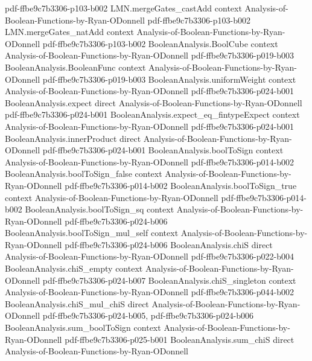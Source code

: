 \begin{lemma}
  {pdf-ffbe9c7b3306-p103-b002}
\proofstep
  {LMN.mergeGates_castAdd}
  {context}
  {Analysis-of-Boolean-Functions-by-Ryan-ODonnell}
  {pdf-ffbe9c7b3306-p103-b002}
\proofstep
  {LMN.mergeGates_natAdd}
  {context}
  {Analysis-of-Boolean-Functions-by-Ryan-ODonnell}
  {pdf-ffbe9c7b3306-p103-b002}
\proofstep
  {BooleanAnalysis.BoolCube}
  {context}
  {Analysis-of-Boolean-Functions-by-Ryan-ODonnell}
  {pdf-ffbe9c7b3306-p019-b003}
\proofstep
  {BooleanAnalysis.BooleanFunc}
  {context}
  {Analysis-of-Boolean-Functions-by-Ryan-ODonnell}
  {pdf-ffbe9c7b3306-p019-b003}
\proofstep
  {BooleanAnalysis.uniformWeight}
  {context}
  {Analysis-of-Boolean-Functions-by-Ryan-ODonnell}
  {pdf-ffbe9c7b3306-p024-b001}
\proofstep
  {BooleanAnalysis.expect}
  {direct}
  {Analysis-of-Boolean-Functions-by-Ryan-ODonnell}
  {pdf-ffbe9c7b3306-p024-b001}
\proofstep
  {BooleanAnalysis.expect_eq_fintypeExpect}
  {context}
  {Analysis-of-Boolean-Functions-by-Ryan-ODonnell}
  {pdf-ffbe9c7b3306-p024-b001}
\proofstep
  {BooleanAnalysis.innerProduct}
  {direct}
  {Analysis-of-Boolean-Functions-by-Ryan-ODonnell}
  {pdf-ffbe9c7b3306-p024-b001}
\proofstep
  {BooleanAnalysis.boolToSign}
  {context}
  {Analysis-of-Boolean-Functions-by-Ryan-ODonnell}
  {pdf-ffbe9c7b3306-p014-b002}
\proofstep
  {BooleanAnalysis.boolToSign_false}
  {context}
  {Analysis-of-Boolean-Functions-by-Ryan-ODonnell}
  {pdf-ffbe9c7b3306-p014-b002}
\proofstep
  {BooleanAnalysis.boolToSign_true}
  {context}
  {Analysis-of-Boolean-Functions-by-Ryan-ODonnell}
  {pdf-ffbe9c7b3306-p014-b002}
\proofstep
  {BooleanAnalysis.boolToSign_sq}
  {context}
  {Analysis-of-Boolean-Functions-by-Ryan-ODonnell}
  {pdf-ffbe9c7b3306-p024-b006}
\proofstep
  {BooleanAnalysis.boolToSign_mul_self}
  {context}
  {Analysis-of-Boolean-Functions-by-Ryan-ODonnell}
  {pdf-ffbe9c7b3306-p024-b006}
\proofstep
  {BooleanAnalysis.chiS}
  {direct}
  {Analysis-of-Boolean-Functions-by-Ryan-ODonnell}
  {pdf-ffbe9c7b3306-p022-b004}
\proofstep
  {BooleanAnalysis.chiS_empty}
  {context}
  {Analysis-of-Boolean-Functions-by-Ryan-ODonnell}
  {pdf-ffbe9c7b3306-p024-b007}
\proofstep
  {BooleanAnalysis.chiS_singleton}
  {context}
  {Analysis-of-Boolean-Functions-by-Ryan-ODonnell}
  {pdf-ffbe9c7b3306-p044-b002}
\proofstep
  {BooleanAnalysis.chiS_mul_chiS}
  {direct}
  {Analysis-of-Boolean-Functions-by-Ryan-ODonnell}
  {pdf-ffbe9c7b3306-p024-b005,
    pdf-ffbe9c7b3306-p024-b006}
\proofstep
  {BooleanAnalysis.sum_boolToSign}
  {context}
  {Analysis-of-Boolean-Functions-by-Ryan-ODonnell}
  {pdf-ffbe9c7b3306-p025-b001}
\proofstep
  {BooleanAnalysis.sum_chiS}
  {direct}
  {Analysis-of-Boolean-Functions-by-Ryan-ODonnell}

\end{lemma}
